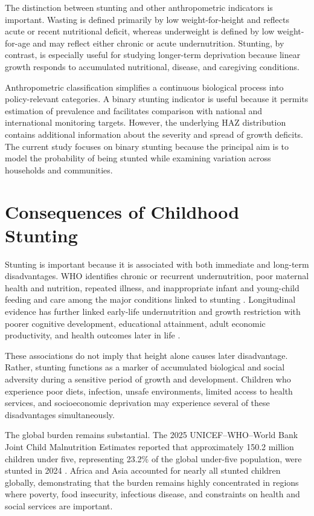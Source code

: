 The distinction between stunting and other anthropometric indicators is important. Wasting is defined primarily by low weight-for-height and reflects acute or recent nutritional deficit, whereas underweight is defined by low weight-for-age and may reflect either chronic or acute undernutrition. Stunting, by contrast, is especially useful for studying longer-term deprivation because linear growth responds to accumulated nutritional, disease, and caregiving conditions.

Anthropometric classification simplifies a continuous biological process into policy-relevant categories. A binary stunting indicator is useful because it permits estimation of prevalence and facilitates comparison with national and international monitoring targets. However, the underlying HAZ distribution contains additional information about the severity and spread of growth deficits. The current study focuses on binary stunting because the principal aim is to model the probability of being stunted while examining variation across households and communities.

\section{Consequences of Childhood Stunting}

Stunting is important because it is associated with both immediate and long-term disadvantages. WHO identifies chronic or recurrent undernutrition, poor maternal health and nutrition, repeated illness, and inappropriate infant and young-child feeding and care among the major conditions linked to stunting \cite{WHOStunting2026}. Longitudinal evidence has further linked early-life undernutrition and growth restriction with poorer cognitive development, educational attainment, adult economic productivity, and health outcomes later in life \cite{VictoraEtAl2008,BlackEtAl2013}.

These associations do not imply that height alone causes later disadvantage. Rather, stunting functions as a marker of accumulated biological and social adversity during a sensitive period of growth and development. Children who experience poor diets, infection, unsafe environments, limited access to health services, and socioeconomic deprivation may experience several of these disadvantages simultaneously.

The global burden remains substantial. The 2025 UNICEF--WHO--World Bank Joint Child Malnutrition Estimates reported that approximately 150.2 million children under five, representing 23.2\% of the global under-five population, were stunted in 2024 \cite{JME2025}. Africa and Asia accounted for nearly all stunted children globally, demonstrating that the burden remains highly concentrated in regions where poverty, food insecurity, infectious disease, and constraints on health and social services are important.

